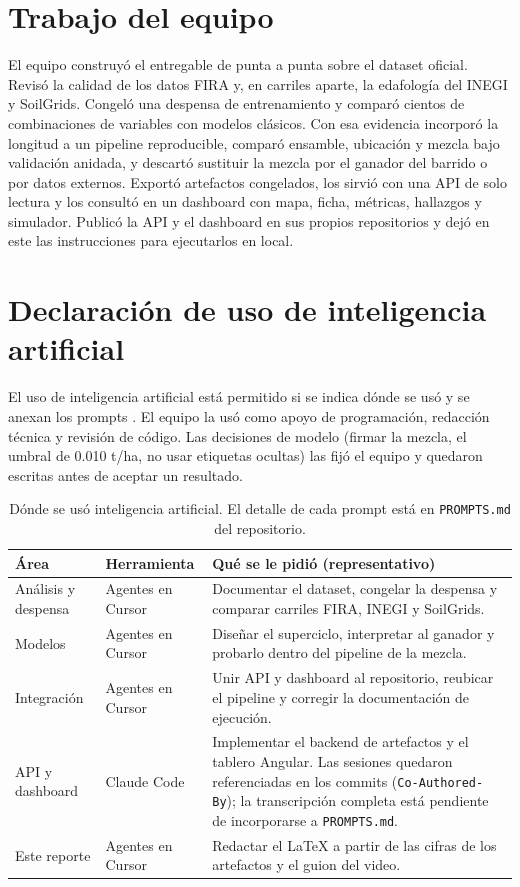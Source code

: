 \section{Trabajo del equipo}

El equipo construyó el entregable de punta a punta sobre el dataset oficial. Revisó la calidad de los datos FIRA y, en carriles aparte, la edafología del INEGI y SoilGrids. Congeló una despensa de entrenamiento y comparó cientos de combinaciones de variables con modelos clásicos. Con esa evidencia incorporó la longitud a un pipeline reproducible, comparó ensamble, ubicación y mezcla bajo validación anidada, y descartó sustituir la mezcla por el ganador del barrido o por datos externos. Exportó artefactos congelados, los sirvió con una API de solo lectura y los consultó en un dashboard con mapa, ficha, métricas, hallazgos y simulador. Publicó la API y el dashboard en sus propios repositorios y dejó en este las instrucciones para ejecutarlos en local.

\section{Declaración de uso de inteligencia artificial}

El uso de inteligencia artificial está permitido si se indica dónde se usó y se anexan los prompts \citep{fira2026}. El equipo la usó como apoyo de programación, redacción técnica y revisión de código. Las decisiones de modelo (firmar la mezcla, el umbral de 0.010 t/ha, no usar etiquetas ocultas) las fijó el equipo y quedaron escritas antes de aceptar un resultado.

\begin{table}[ht]
\centering
\caption{Dónde se usó inteligencia artificial. El detalle de cada prompt está en \texttt{PROMPTS.md} del repositorio.}
\label{tab:ia}
\small
\begin{tabular}{p{3.3cm}p{3.4cm}p{6.6cm}}
\toprule
Área & Herramienta & Qué se le pidió (representativo) \\
\midrule
Análisis y despensa & Agentes en Cursor & Documentar el dataset, congelar la despensa y comparar carriles FIRA, INEGI y SoilGrids. \\
Modelos & Agentes en Cursor & Diseñar el superciclo, interpretar al ganador y probarlo dentro del pipeline de la mezcla. \\
Integración & Agentes en Cursor & Unir API y dashboard al repositorio, reubicar el pipeline y corregir la documentación de ejecución. \\
API y dashboard & Claude Code & Implementar el backend de artefactos y el tablero Angular. Las sesiones quedaron referenciadas en los commits (\texttt{Co-Authored-By}); la transcripción completa está pendiente de incorporarse a \texttt{PROMPTS.md}. \\
Este reporte & Agentes en Cursor & Redactar el LaTeX a partir de las cifras de los artefactos y el guion del video. \\
\bottomrule
\end{tabular}
\end{table}

